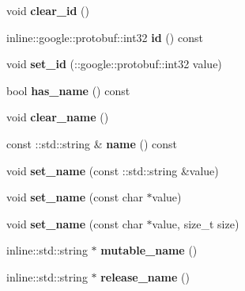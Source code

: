 \begin{DoxyCompactItemize}
\item 
\hypertarget{class_person_a10eef38fc406f21dbaf29317b60f3117}{}void {\bfseries clear\+\_\+id} ()\label{class_person_a10eef38fc406f21dbaf29317b60f3117}

\item 
\hypertarget{class_person_a2245d2f49e0208ea725e60bd62a6c9c2}{}inline\+::google\+::protobuf\+::int32 {\bfseries id} () const \label{class_person_a2245d2f49e0208ea725e60bd62a6c9c2}

\item 
\hypertarget{class_person_aa932c5a5545df7dfa7d0529d5c7a24a1}{}void {\bfseries set\+\_\+id} (\+::google\+::protobuf\+::int32 value)\label{class_person_aa932c5a5545df7dfa7d0529d5c7a24a1}

\item 
\hypertarget{class_person_a772592a4a3642a00adc3a626b3b54482}{}bool {\bfseries has\+\_\+name} () const \label{class_person_a772592a4a3642a00adc3a626b3b54482}

\item 
\hypertarget{class_person_a96701409fc9b191cb3fd432664554c7e}{}void {\bfseries clear\+\_\+name} ()\label{class_person_a96701409fc9b191cb3fd432664554c7e}

\item 
\hypertarget{class_person_aabd7ac7f0b9a48fce7680bbfbdbc1b2a}{}const \+::std\+::string \& {\bfseries name} () const \label{class_person_aabd7ac7f0b9a48fce7680bbfbdbc1b2a}

\item 
\hypertarget{class_person_a60d6c2172b6bb4a8765ba0b5198fb28a}{}void {\bfseries set\+\_\+name} (const \+::std\+::string \&value)\label{class_person_a60d6c2172b6bb4a8765ba0b5198fb28a}

\item 
\hypertarget{class_person_af19ef74a717a4e5ea836cadf1b4ca55b}{}void {\bfseries set\+\_\+name} (const char $\ast$value)\label{class_person_af19ef74a717a4e5ea836cadf1b4ca55b}

\item 
\hypertarget{class_person_aecf956c7e706fc684ef02aebefebff19}{}void {\bfseries set\+\_\+name} (const char $\ast$value, size\+\_\+t size)\label{class_person_aecf956c7e706fc684ef02aebefebff19}

\item 
\hypertarget{class_person_aef017dd443da3b828926dd26202273e1}{}inline\+::std\+::string $\ast$ {\bfseries mutable\+\_\+name} ()\label{class_person_aef017dd443da3b828926dd26202273e1}

\item 
\hypertarget{class_person_ae3b6a2336298020abcd52fc0002a23fd}{}inline\+::std\+::string $\ast$ {\bfseries release\+\_\+name} ()\label{class_person_ae3b6a2336298020abcd52fc0002a23fd}


\end{DoxyCompactItemize}
